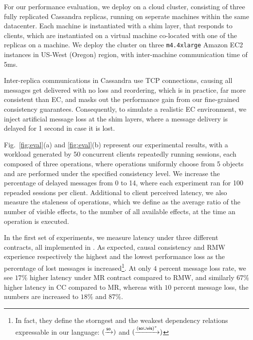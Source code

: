 For our performance evaluation, we deploy \tool on a cloud cluster,
consisting of three fully replicated Cassandra replicas, running on
seperate machines within the same
datacenter. 
Each machine is instantiated with a
\tool shim layer, that responds to clients,  
 which are instantiated on a virtual machine 
co-located with one of the replicas on a machine.
We deploy the cluster on three \texttt{m4.4xlarge} Amazon EC2 instances
in US-West (Oregon) region, with inter-machine communication time of 5ms.

Inter-replica communications in Cassandra use TCP connections, 
causing all messages get delivered with no loss and reordering, which
is in practice, far  more consistent than EC,  and masks out the
performance gain from our fine-grained consistency guarantees.
Consequently, to simulate a
realistic EC environment, we inject artificial message loss at the shim
layers, where a message delivery is delayed for 1
second in case it is lost.

Fig.~\ref{fig:eval}(a) and \ref{fig:eval}(b) represent
our experimental results, with a workload generated 
by 50 concurrent clients repeatedly running sessions, each composed of three
operations, where operations uniformly choose from 5 objects and are
performed under the specified consistency level. 
We increase the
percentage of delayed messages from 0 to 14, where each experiment ran for
100 repeaded sessions per client. Additional to client perceived
latency, we also measure the staleness of operations, which we define as
the average ratio of the number of visible effects,
to the number of all available effects, at the time an operation is executed.

In the first set of experiments, we measure latency under
three different \LB{} contracts, all implemented in \tool. As
expected,
causal consistency and RMW experience respectively the highest and the
lowest
performance loss as the percentage of lost messages is increased\footnote{In fact, 
they define the storngest and the weakest
\LB{} dependency relations expressable in our language:
$(\xrightarrow{{\textsf{so}}})$ and $(\xrightarrow{({\textsf{so}}\cup{\normalfont \textsf{vis}})^*})$}.
At only $4$ percent message loss rate, we see $17\%$ higher latency under MR
contract compared to RMW, and similarly $67\%$ higher latency in CC
compared to MR, whereas with $10$ percent message loss, the numbers are
increased to $18\%$ and $87\%$.


